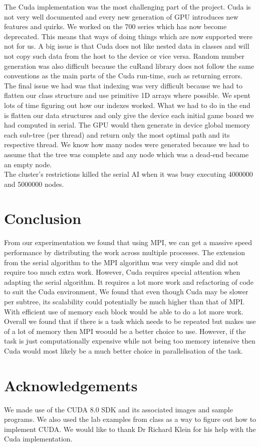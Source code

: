 \documentclass[a4paper]{article}
\begin{document}
\noindent The Cuda implementation was the most challenging part of the project. Cuda is not very well documented and every new generation of GPU introduces new features and quirks. We worked on the 700 series which has now become deprecated. This means that ways of doing things which are now supported were not for us. A big issue is that Cuda does not like nested data in classes and will not copy such data from the host to the device or vice versa. Random number generation was also difficult because the cuRand library does not follow the same conventions as the main parts of the Cuda run-time, such as returning errors. The final issue we had was that indexing was very difficult because we had to flatten our class structure and use primitive 1D arrays where possible. We spent lots of time figuring out how our indexes worked. What we had to do in the end is flatten our data structures and only give the device each initial game board we had computed in serial. The GPU would then generate in device global memory each sub-tree (per thread) and return only the most optimal path and its respective thread. We know how many nodes were generated because we had to assume that the tree was complete and any node which was a dead-end became an empty node.\\

\noindent The cluster’s restrictions killed the serial AI when it was busy executing 4000000 and 5000000 nodes.


\section{Conclusion}
From our experimentation we found that using MPI, we can get a massive speed performance by distributing the work across multiple processes. The extension from the serial algorithm to the MPI algorithm was very simple and did not require too much extra work. However, Cuda requires special attention when adapting the serial algorithm. It requires a lot more work and refactoring of code to suit the Cuda environment, We found that even though Cuda may be slower per subtree, its scalability could potentially be much higher than that of MPI. With efficient use of memory each block would be able to do a lot more work. Overall we found that if there is a task which needs to be repeated but makes use of a lot of memory then MPI woould be a better choice to use. However, if the task is just computationally expensive while not being too memory intensive then Cuda would most likely be a much better choice in parallelisation of the task.



\section*{Acknowledgements}
We made use of the CUDA 8.0 SDK and its associated images and sample programs. We also used the lab examples from class as a way to figure out how to implement CUDA. We would like to thank Dr Richard Klein for his help with the Cuda implementation.


{}
\end{document}
